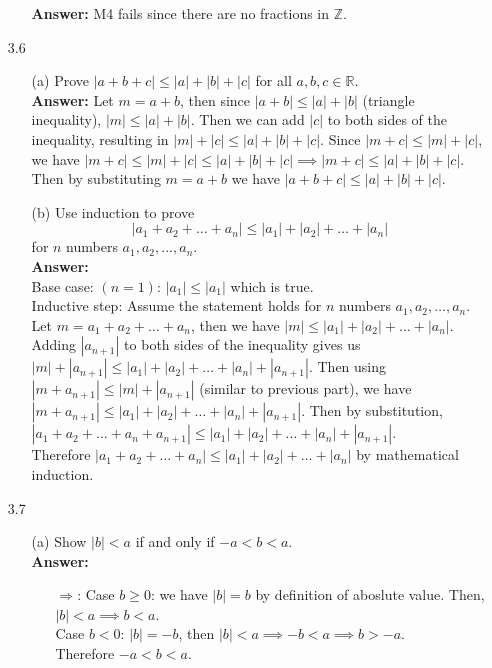 \documentclass{article}
\begin{document}
\begin{itemize}
\begin{itemize}
                    \textbf{Answer: } M4 fails since there are no fractions in $\mathbb{Z}$.
          \end{itemize}
    \item [3.6]
          \begin{itemize}
              \item [(a)] Prove $|a+b+c|\leq|a|+|b|+|c|$ for all $a,b,c\in\mathbb{R}$.\\
                    \textbf{Answer: } Let $m=a+b$, then since $|a+b|\leq |a|+|b|$ (triangle inequality), $|m|\leq |a|+|b|$. Then we can add $|c|$ to both sides of the inequality, resulting in $|m|+|c|\leq |a|+|b|+|c|$. Since $|m+c|\leq|m|+|c|$, we have $|m+c|\leq|m|+|c|\leq|a|+|b|+|c|\implies|m+c|\leq|a|+|b|+|c|$. Then by substituting $m=a+b$ we have $|a+b+c|\leq|a|+|b|+|c|$.
              \item [(b)] Use induction to prove \[|a_1+a_2+\ldots+a_n|\leq|a_1|+|a_2|+\ldots+|a_n|\] for $n$ numbers $a_1,a_2,...,a_n$.\\
                    \textbf{Answer: }\\
                    Base case: $(n=1)$: $|a_1|\leq|a_1|$ which is true.\\
                    Inductive step: Assume the statement holds for $n$ numbers $a_1,a_2,\ldots,a_n$. Let $m=a_1+a_2+\ldots+a_n$, then we have $|m|\leq|a_1|+|a_2|+\ldots+|a_n|$. Adding $|a_{n+1}|$ to both sides of the inequality gives us $|m|+|a_{n+1}|\leq|a_1|+|a_2|+\ldots+|a_n|+|a_{n+1}|$. Then using $|m+a_{n+1}|\leq|m|+|a_{n+1}|$ (similar to previous part), we have $|m+a_{n+1}|\leq|a_1|+|a_2|+\ldots+|a_n|+|a_{n+1}|$. Then by substitution, $|a_1+a_2+\ldots+a_n+a_{n+1}|\leq|a_1|+|a_2|+\ldots+|a_n|+|a_{n+1}|$.\\
                    Therefore $|a_1+a_2+\ldots+a_n|\leq|a_1|+|a_2|+\ldots+|a_n|$ by mathematical induction.
          \end{itemize}
    \item [3.7]
          \begin{itemize}
              \item [(a)] Show $|b|<a$ if and only if $-a<b<a$.\\
                    \textbf{Answer: }
                    \begin{itemize}
                        \item [$\Rightarrow$:] Case $b\geq 0$: we have $|b|=b$ by definition of aboslute value. Then, $|b|<a\implies b<a$. \\Case $b<0$: $|b|=-b$, then $|b|<a\implies -b<a\implies b>-a$. \\Therefore $-a<b<a$.

\end{itemize}
\end{itemize}
\end{itemize}
\end{document}

